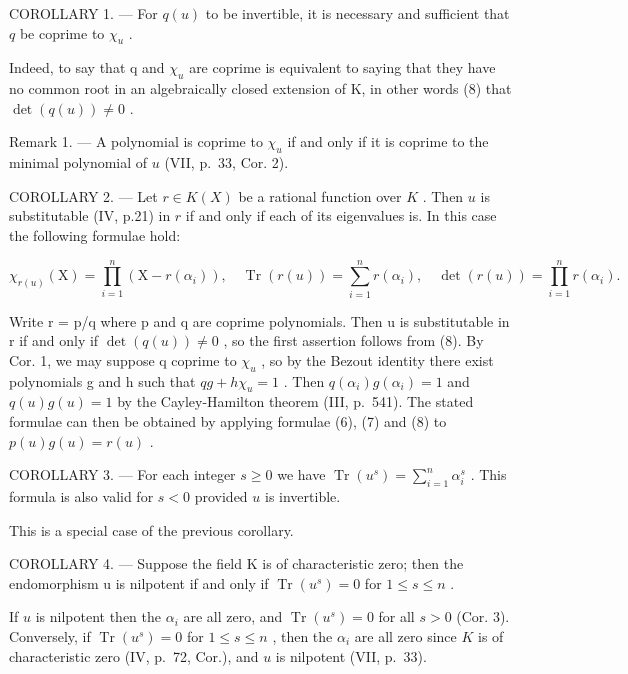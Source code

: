 COROLLARY 1. --- For \(q(u)\) to be invertible, it is necessary and sufficient that \(q\) be coprime to \(\chi_u\) .

Indeed, to say that q and \(\chi_{u}\) are coprime is equivalent to saying that they have no common root in an algebraically closed extension of K, in other words (8) that \(\det(q(u)) \neq 0\) .

Remark 1. --- A polynomial is coprime to \(\chi_{u}\) if and only if it is coprime to the minimal polynomial of \(u\) (VII, p.~33, Cor. 2).

COROLLARY 2. --- Let \(r \in K(X)\) be a rational function over \(K\) . Then \(u\) is substitutable (IV, p.21) in \(r\) if and only if each of its eigenvalues is. In this case the following formulae hold:

\[
\chi_ {r (u)} (\mathrm{X}) = \prod_ {i = 1} ^ {n} \left(\mathrm{X} - r \left(\alpha_ {i}\right)\right), \quad \operatorname{Tr} (r (u)) = \sum_ {i = 1} ^ {n} r \left(\alpha_ {i}\right), \quad \det (r (u)) = \prod_ {i = 1} ^ {n} r \left(\alpha_ {i}\right).
\]

Write r = p/q where p and q are coprime polynomials. Then u is substitutable in r if and only if \(\det(q(u)) \neq 0\) , so the first assertion follows from (8). By Cor. 1, we may suppose q coprime to \(\chi_{u}\) , so by the Bezout identity there exist polynomials g and h such that \(qg + h\chi_{u} = 1\) . Then \(q(\alpha_{i})g(\alpha_{i}) = 1\) and \(q(u)g(u) = 1\) by the Cayley-Hamilton theorem (III, p.~541). The stated formulae can then be obtained by applying formulae (6), (7) and (8) to \(p(u)g(u) = r(u)\) .

COROLLARY 3. --- For each integer \(s \geqslant 0\) we have \(\operatorname{Tr}(u^s) = \sum_{i=1}^{n} \alpha_i^s\) . This formula is also valid for \(s < 0\) provided \(u\) is invertible.

This is a special case of the previous corollary.

COROLLARY 4. --- Suppose the field K is of characteristic zero; then the endomorphism u is nilpotent if and only if \(\operatorname{Tr}(u^{s}) = 0\) for \(1 \leqslant s \leqslant n\) .

If \(u\) is nilpotent then the \(\alpha_{i}\) are all zero, and \(\operatorname{Tr}(u^{s}) = 0\) for all \(s > 0\) (Cor. 3). Conversely, if \(\operatorname{Tr}(u^{s}) = 0\) for \(1 \leqslant s \leqslant n\) , then the \(\alpha_{i}\) are all zero since \(K\) is of characteristic zero (IV, p.~72, Cor.), and \(u\) is nilpotent (VII, p.~33).

